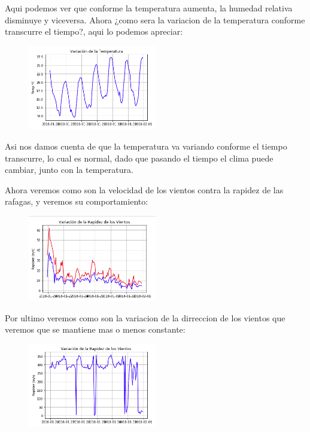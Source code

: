 \documentclass{article}
\begin{document}
Aqui podemos ver que conforme la temperatura aumenta, la humedad relativa disminuye y viceversa. Ahora ¿como sera la variacion de la temperatura conforme transcurre el tiempo?, aqui lo podemos apreciar:
\begin{figure}[h]
\centering
\includegraphics[width=0.5\textwidth]{ff.png}
\end{figure}

Asi nos damos cuenta de que la temperatura va variando conforme el tiempo transcurre, lo cual es normal, dado que pasando el tiempo el clima puede cambiar, junto con la temperatura.
\newpage

Ahora veremos como son la velocidad de los vientos contra la rapidez de las rafagas, y veremos su comportamiento:

\begin{figure}[h]
\centering
\includegraphics[width=0.5\textwidth]{gg.png}
\end{figure}

Por ultimo veremos como son la variacion de la dirreccion de los vientos que veremos que se mantiene mas o menos constante:

\begin{figure}[h]
\centering
\includegraphics[width=0.5\textwidth]{vv.png}
\end{figure}
\end{document}
